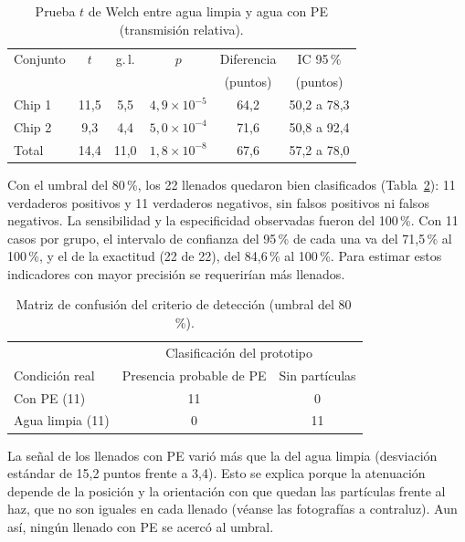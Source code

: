 \begin{table}[htbp]
  \centering
  \caption{Prueba $t$ de Welch entre agua limpia y agua con PE (transmisión relativa).}
  \label{tab:campana_welch}
  \begin{tabular}{lccccc}
    \hline
    Conjunto & $t$ & g.\,l. & $p$ & Diferencia & IC 95\,\% \\
     &  &  &  & (puntos) & (puntos) \\
    \hline
    Chip 1 & 11,5 & 5,5  & $4{,}9 \times 10^{-5}$ & 64,2 & 50,2 a 78,3 \\
    Chip 2 & 9,3  & 4,4  & $5{,}0 \times 10^{-4}$ & 71,6 & 50,8 a 92,4 \\
    Total  & 14,4 & 11,0 & $1{,}8 \times 10^{-8}$ & 67,6 & 57,2 a 78,0 \\
    \hline
  \end{tabular}
\end{table}

Con el umbral del 80\,\%, los 22 llenados quedaron bien clasificados
(Tabla~\ref{tab:campana_confusion}): 11 verdaderos positivos y 11 verdaderos
negativos, sin falsos positivos ni falsos negativos. La sensibilidad y la
especificidad observadas fueron del 100\,\%. Con 11 casos por grupo, el intervalo de
confianza del 95\,\% de cada una va del 71,5\,\% al 100\,\%, y el de la exactitud
(22 de 22), del 84,6\,\% al 100\,\%. Para estimar estos indicadores con mayor
precisión se requerirían más llenados.

\begin{table}[htbp]
  \centering
  \caption{Matriz de confusión del criterio de detección (umbral del 80\,\%).}
  \label{tab:campana_confusion}
  \begin{tabular}{lcc}
    \hline
     & \multicolumn{2}{c}{Clasificación del prototipo} \\
    Condición real & Presencia probable de PE & Sin partículas \\
    \hline
    Con PE (11)      & 11 & 0  \\
    Agua limpia (11) & 0  & 11 \\
    \hline
  \end{tabular}
\end{table}

La señal de los llenados con PE varió más que la del agua limpia (desviación
estándar de 15,2 puntos frente a 3,4). Esto se explica porque la atenuación depende
de la posición y la orientación con que quedan las partículas frente al haz, que no
son iguales en cada llenado (véanse las fotografías a contraluz). Aun así, ningún
llenado con PE se acercó al umbral.

